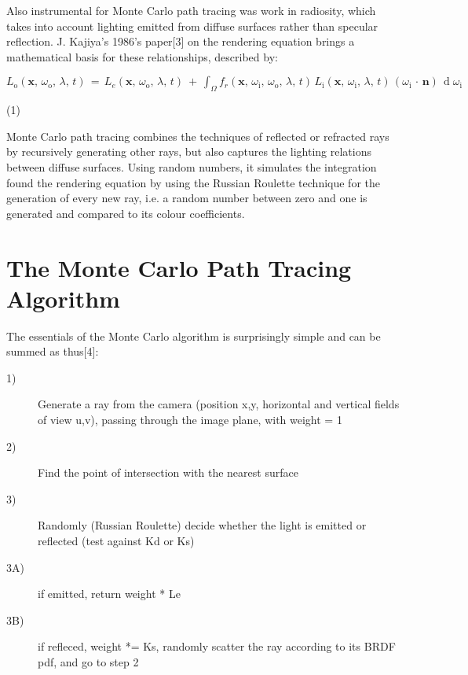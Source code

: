 \documentclass[journal]{IEEEtran}
\begin{document}
\par

Also instrumental for Monte Carlo path tracing was work in radiosity, which takes into account lighting emitted from diffuse surfaces rather than specular reflection. J. Kajiya's 1986's paper[3] on the rendering equation brings a mathematical basis for these relationships, described by:

\begin{center}
$L_{\text{o}}(\mathbf x,\, \omega_{\text{o}},\, \lambda,\, t) \,=\, L_e(\mathbf x,\, \omega_{\text{o}},\, \lambda,\, t) \ +\, \int_\Omega f_r(\mathbf x,\, \omega_{\text{i}},\, \omega_{\text{o}},\, \lambda,\, t)\, L_{\text{i}}(\mathbf x,\, \omega_{\text{i}},\, \lambda,\, t)\, (\omega_{\text{i}}\,\cdot\,\mathbf n)\, \operatorname d \omega_{\text{i}}$
\end{center}

\begin{flushright}
\par 
(1)
\end{flushright}

\par
Monte Carlo path tracing combines the techniques of reflected or refracted rays by recursively generating other rays, but also captures the lighting relations between diffuse surfaces. Using random numbers, it simulates the integration found the rendering equation by using the Russian Roulette technique for the generation of every new ray, i.e. a random number between zero and one is generated and compared to its colour coefficients.

\section{The Monte Carlo Path Tracing Algorithm}
The essentials of the Monte Carlo algorithm is surprisingly simple and can be summed as thus[4]:

\begin{description}
  \item[1)] Generate a ray from the camera (position x,y, horizontal and vertical fields of view u,v), passing through the image plane, with weight = 1
  \item[2)] Find the point of intersection with the nearest surface
  \item[3)] Randomly (Russian Roulette) decide whether the light is emitted or reflected (test against Kd or Ks)
  \item[3A)] if emitted, return weight * Le
  \item[3B)] if refleced, weight *= Ks, randomly scatter the ray according to its BRDF pdf, and go to step 2
\end{description}
\end{document}
